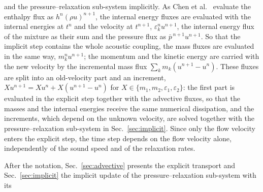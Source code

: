 and the pressure--relaxation sub-system implicitly. As Chen et al.\ \cite{Chen2026} evaluate the enthalpy flux as $h^n(\rho u)^{n+1}$,
the internal energy fluxes are evaluated with the internal energies at $t^n$ and the velocity at $t^{n+1}$, $\varepsilon^n_ku^{n+1}$, the internal
energy flux of the mixture as their sum and the pressure flux as $\bar p^{\,n+1}u^{n+1}$. So that the implicit step contains the whole
acoustic coupling, the mass fluxes are evaluated in the same way, $m^n_ku^{n+1}$; the momentum and the kinetic energy are carried
with the new velocity by the incremental mass flux $\sum_km_k(u^{n+1}-u^n)$. These fluxes are split into an old-velocity part and an
increment, $Xu^{n+1}=Xu^n+X(u^{n+1}-u^n)$ for $X\in\{m_1,m_2,\varepsilon_1,\varepsilon_2\}$: the first part is evaluated in the explicit step together with the advective fluxes, so that the masses and the internal energies receive the same
numerical dissipation, and the increments, which depend on the unknown velocity, are solved together with the
pressure--relaxation sub-system in Sec.~\ref{sec:implicit}. Since only the flow velocity enters the explicit step, the time step depends
on the flow velocity alone, independently of the sound speed and of the relaxation rates.

After the notation, Sec.~\ref{sec:advective} presents the explicit
transport and Sec.~\ref{sec:implicit} the implicit update of the pressure--relaxation sub-system with its

